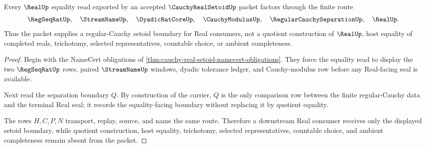 \begin{theorem}
\label{thm:cauchy-real-setoid-regular-quotient-boundary}
Every $\RealUp$ equality read exported by an accepted $\CauchyRealSetoidUp$ packet factors through the finite route
$$
\RegSeqRatUp,\quad \StreamNameUp,\quad \DyadicRatCoreUp,\quad \CauchyModulusUp,\quad \RegularCauchySeparationUp,\quad \RealUp .
$$
Thus the packet supplies a regular-Cauchy setoid boundary for Real consumers, not a quotient construction of $\RealUp$, host equality of completed reals, trichotomy, selected representatives, countable choice, or ambient completeness.
\end{theorem}
\begin{proof}
Begin with the NameCert obligations of \autoref{thm:cauchy-real-setoid-namecert-obligations}. They force the equality read to display the two $\RegSeqRatUp$ rows, paired $\StreamNameUp$ windows, dyadic tolerance ledger, and Cauchy-modulus row before any Real-facing seal is available.

Next read the separation boundary $Q$. By construction of the carrier, $Q$ is the only comparison row between the finite regular-Cauchy data and the terminal Real seal; it records the equality-facing boundary without replacing it by quotient equality.

The rows $H,C,P,N$ transport, replay, source, and name the same route. Therefore a downstream Real consumer receives only the displayed setoid boundary, while quotient construction, host equality, trichotomy, selected representatives, countable choice, and ambient completeness remain absent from the packet.
\end{proof}



